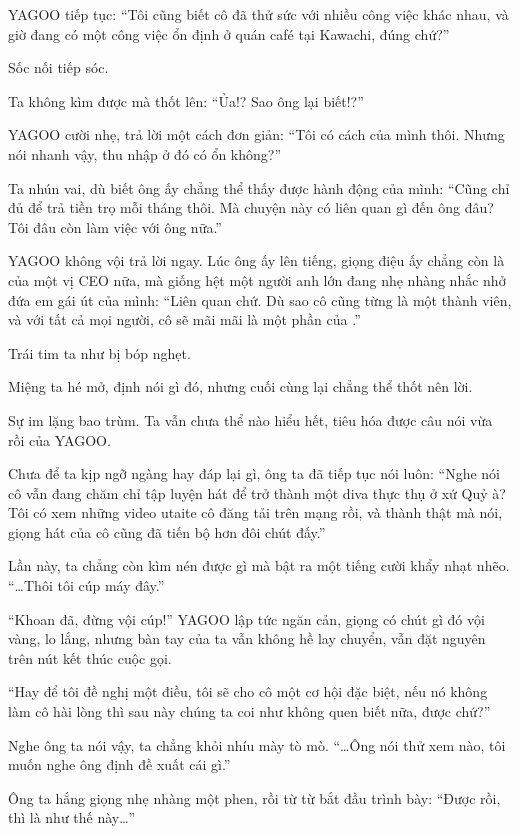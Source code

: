 \documentclass[../main.tex]{subfiles}
\begin{document}
YAGOO tiếp tục: ``Tôi cũng biết cô đã thử sức với nhiều công việc khác nhau, và giờ đang có một công việc ổn định ở quán café tại Kawachi, đúng chứ?''

Sốc nối tiếp sóc.

Ta không kìm được mà thốt lên: ``Ủa!? Sao ông lại biết!?''

YAGOO cười nhẹ, trả lời một cách đơn giản: ``Tôi có cách của mình thôi. Nhưng nói nhanh vậy, thu nhập ở đó có ổn không?''

Ta nhún vai, dù biết ông ấy chẳng thể thấy được hành động của mình: ``Cũng chỉ đủ để trả tiền trọ mỗi tháng thôi. Mà chuyện này có liên quan gì đến ông đâu? Tôi đâu còn làm việc với ông nữa.''

YAGOO không vội trả lời ngay. Lúc ông ấy lên tiếng, giọng điệu ấy chẳng còn là của một vị CEO nữa, mà giống hệt một người anh lớn đang nhẹ nhàng nhắc nhở đứa em gái út của mình: ``Liên quan chứ. Dù sao cô cũng từng là một thành viên, và với tất cả mọi người, cô sẽ mãi mãi là một phần của \hll.''

Trái tim ta như bị bóp nghẹt.

Miệng ta hé mở, định nói gì đó, nhưng cuối cùng lại chẳng thể thốt nên lời.

Sự im lặng bao trùm. Ta vẫn chưa thể nào hiểu hết, tiêu hóa được câu nói vừa rồi của YAGOO.

Chưa để ta kịp ngỡ ngàng hay đáp lại gì, ông ta đã tiếp tục nói luôn: ``Nghe nói cô vẫn đang chăm chỉ tập luyện hát để trở thành một diva thực thụ ở xứ Quỷ à? Tôi có xem những video utaite cô đăng tải trên mạng rồi, và thành thật mà nói, giọng hát của cô cũng đã tiến bộ hơn đôi chút đấy.''

Lần này, ta chẳng còn kìm nén được gì mà bật ra một tiếng cười khẩy nhạt nhẽo. ``\dots Thôi tôi cúp máy đây.''

``Khoan đã, đừng vội cúp!'' YAGOO lập tức ngăn cản, giọng có chút gì đó vội vàng, lo lắng, nhưng bàn tay của ta vẫn không hề lay chuyển, vẫn đặt nguyên trên nút kết thúc cuộc gọi.

``Hay để tôi đề nghị một điều, tôi sẽ cho cô một cơ hội đặc biệt, nếu nó không làm cô hài lòng thì sau này chúng ta coi như không quen biết nữa, được chứ?''

Nghe ông ta nói vậy, ta chẳng khỏi nhíu mày tò mò. ``\dots Ông nói thử xem nào, tôi muốn nghe ông định đề xuất cái gì.''

Ông ta hắng giọng nhẹ nhàng một phen, rồi từ từ bắt đầu trình bày: ``Được rồi, thì là như thế này\dots''
\end{document}
